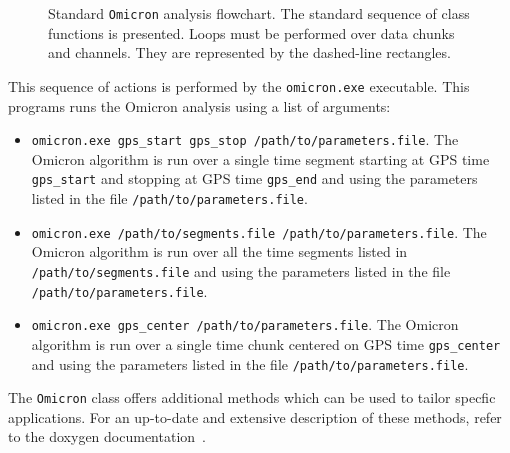 \begin{figure}
  \center
  \caption{Standard \texttt{Omicron} analysis flowchart. The standard sequence of class functions is presented. Loops must be performed over data chunks and channels. They are represented by the dashed-line rectangles.}
  \label{fig:omicron_flowchart}
\end{figure}

This sequence of actions is performed by the \texttt{omicron.exe} executable. This programs runs the Omicron analysis using a list of arguments:
\begin{itemize}
  \item \texttt{omicron.exe gps\_start gps\_stop /path/to/parameters.file}. The Omicron algorithm is run over a single time segment starting at GPS time \texttt{gps\_start} and stopping at GPS time \texttt{gps\_end} and using the parameters listed in the file \texttt{/path/to/parameters.file}.
  \item \texttt{omicron.exe /path/to/segments.file /path/to/parameters.file}. The Omicron algorithm is run over all the time segments listed in \texttt{/path/to/segments.file} and using the parameters listed in the file\\
    \texttt{/path/to/parameters.file}.
  \item \texttt{omicron.exe gps\_center /path/to/parameters.file}. The Omicron algorithm is run over a single time chunk centered on GPS time \texttt{gps\_center} and using the parameters listed in the file \texttt{/path/to/parameters.file}.
\end{itemize}
The \texttt{Omicron} class offers additional methods which can be used to tailor specfic applications. For an up-to-date and extensive description of these methods, refer to the doxygen documentation~\cite{Omicron_doxygen}.


